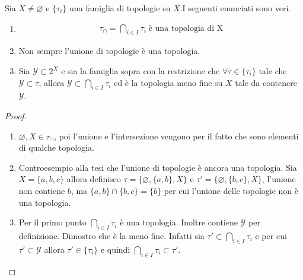 \begin{proposition}
	Sia $X \neq \varnothing$ e $\{\tau_i\}$ una famiglia di topologie su $X$.I seguenti enunciati sono veri.
	\begin{enumerate}
		\item \begin{equation}
		\begin{aligned}
		\tau_\cap = \bigcap_{i \in I} \tau_i \; \text{è una topologia di X} 
		\end{aligned}
		\end{equation}
		\item Non sempre l'unione di topologie è una topologia.
		\item Sia $\mathcal{Y} \subset 2^X$ e sia la famiglia sopra con la restrizione che $\forall \tau \in \{\tau_i\}$ tale che $\mathcal{Y} \subset \tau$, allora $\mathcal{Y} \subset \bigcap_{i \in I} \tau_i $ ed è la topologia meno fine su $X$ tale da contenere $\mathcal{Y}$.
	\end{enumerate}
\end{proposition}
\begin{proof}
	\begin{enumerate}
		\item $\varnothing, X \in \tau_\cap$, poi l'unione e l'intersezione vengono per il fatto che sono elementi di qualche topologia.
		\item Controesempio alla tesi che l'unione di topologie è ancora una topologia. Sia $X = \{a,b,c\}$ allora definisco $\tau = \{\varnothing, \{a,b\}, X\}$ e $\tau' = \{\varnothing, \{b,c\}, X\}$, l'unione non contiene $b$, ma $\{a,b\} \cap \{b,c\} = \{b\}$ per cui l'unione delle topologie non è una topologia.
		\item Per il primo punto $\bigcap_{i \in I} \tau_i$ è una topologia. Inoltre contiene $\mathcal{Y}$ per definizione. Dimostro che è la meno fine. Infatti sia $\tau' \subset \bigcap_{i \in I} \tau_i$ e per cui $\tau' \subset \mathcal{Y}$ allora $\tau' \in \{\tau_i\}$ e quindi $\bigcap_{i \in I} \tau_i \subset \tau'$. 
	\end{enumerate}	
\end{proof}

